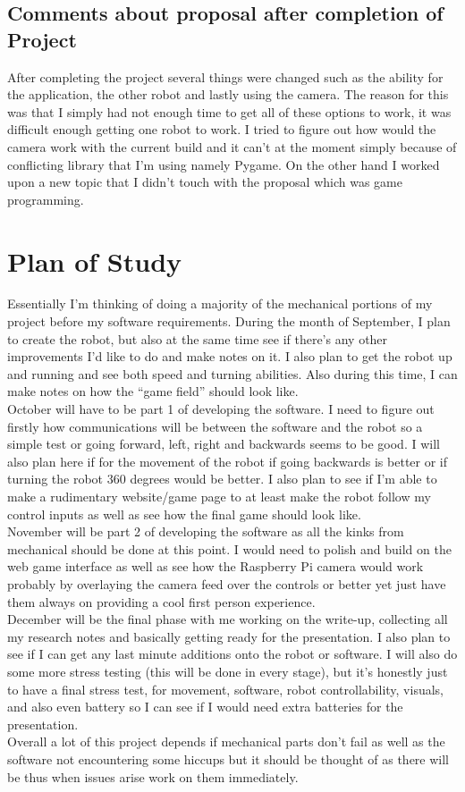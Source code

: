 \documentclass[13ptletterpaper]{paper}
\newcommand\tab[1][1cm]{\hspace*{#1}}
\begin{document}
\begin{flushleft}
		\subsection{Comments about proposal after completion of Project}
		\tab After completing the project several things were changed such as the ability for the application, the other robot and lastly using the camera. The reason for this was that I simply had not enough time to get all of these options to work, it was difficult enough getting one robot to work. I tried to figure out how would the camera work with the current build and it can't at the moment simply because of conflicting library that I'm using namely Pygame. On the other hand I worked upon a new topic that I didn't touch with the proposal which was game programming.
		\section{Plan of Study}
		\tab Essentially I’m thinking of doing a majority of the mechanical portions of my project before my software requirements.
		During the month of September, I plan to create the robot, but also at the same time see if there’s any other improvements I’d like to do and make notes on it. I also plan to get the robot up and running and see both speed and turning abilities. Also during this time, I can make notes on how the “game field” should look like.\\
		\tab October will have to be part 1 of developing the software. I need to figure out firstly how communications will be between the software and the robot so a simple test or going forward, left, right and backwards seems to be good. I will also plan here if for the movement of the robot if going backwards is better or if turning the robot 360 degrees would be better. I also plan to see if I’m able to make a rudimentary website/game page to at least make the robot follow my control inputs as well as see how the final game should look like.\\
		\tab November will be part 2 of developing the software as all the kinks from mechanical should be done at this point. I would need to polish and build on the web game interface as well as see how the Raspberry Pi camera would work probably by overlaying the camera feed over the controls or better yet just have them always on providing a cool first person experience. \\
		\tab December will be the final phase with me working on the write-up, collecting all my research notes and basically getting ready for the presentation. I also plan to see if I can get any last minute additions onto the robot or software. I will also do some more stress testing (this will be done in every stage), but it’s honestly just to have a final stress test, for movement, software, robot controllability, visuals, and also even battery so I can see if I would need extra batteries for the presentation. \\
		\tab Overall a lot of this project depends if mechanical parts don’t fail as well as the software not encountering some hiccups but it should be thought of as there will be thus when issues arise work on them immediately.\\
		

\end{flushleft}
\end{document}
